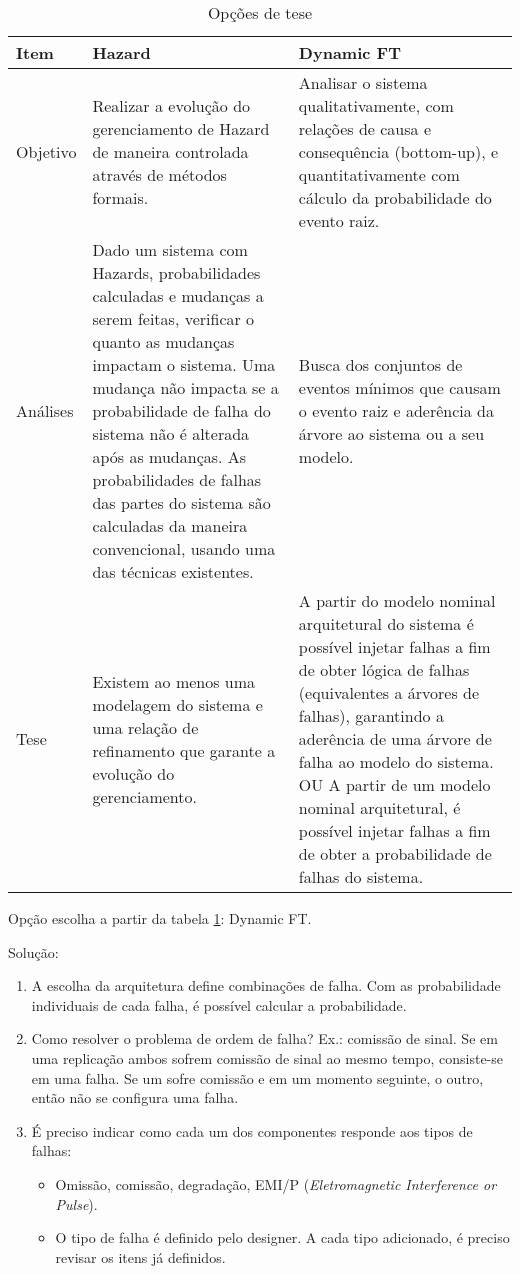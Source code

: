 
\begin{table}
\begin{center}
\begin{tabular}{l|p{6.5cm}|p{6.5cm}}
Item & Hazard & Dynamic FT\\
\hline
\hline
Objetivo 
  & Realizar a evolução do gerenciamento de Hazard de maneira controlada através de métodos formais. 
  & Analisar o sistema qualitativamente, com relações de causa e consequência (bottom-up), e quantitativamente com cálculo da probabilidade do evento raiz.\\
\hline
Análises 
  & Dado um sistema com Hazards, probabilidades calculadas e mudanças a serem feitas, verificar o quanto as mudanças impactam o sistema. Uma mudança não impacta se a probabilidade de falha do sistema não é alterada após as mudanças. As probabilidades de falhas das partes do sistema são calculadas da maneira convencional, usando uma das técnicas existentes. 
  & Busca dos conjuntos de eventos mínimos que causam o evento raiz e aderência da árvore ao sistema ou a seu modelo. \\
\hline
Tese 
  & Existem ao menos uma modelagem do sistema e uma relação de refinamento que garante a evolução do gerenciamento. 
  & A partir do modelo nominal arquitetural do sistema é possível injetar falhas a fim de obter lógica de falhas (equivalentes a árvores de falhas), garantindo a aderência de uma árvore de falha ao modelo do sistema. OU A partir de um modelo nominal arquitetural, é possível injetar falhas a fim de obter a probabilidade de falhas do sistema.\\
\hline
\end{tabular}
\end{center}
\caption{Opções de tese}
\label{tbl:thesis-decision}
\end{table}

Opção escolha a partir da tabela \cref{tbl:thesis-decision}: Dynamic FT.

Solução:
\begin{enumerate}
  \item A escolha da arquitetura define combinações de falha. Com as probabilidade individuais de cada falha, é possível calcular a probabilidade. 
  \item Como resolver o problema de ordem de falha? Ex.: comissão de sinal. Se em uma replicação ambos sofrem comissão de sinal ao mesmo tempo, consiste-se em uma falha. Se um sofre comissão e em um momento seguinte, o outro, então não se configura uma falha.
  \item É preciso indicar como cada um dos componentes responde aos tipos de falhas:
  \begin{itemize}
    \item Omissão, comissão, degradação, EMI/P (\emph{Eletromagnetic Interference or Pulse}).
    \item O tipo de falha é definido pelo designer. A cada tipo adicionado, é preciso revisar os itens já definidos.
  \end{itemize}

\end{enumerate}